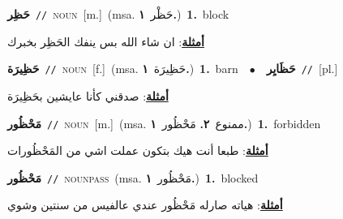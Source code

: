 \documentclass[10pt,a4paper,twoside]{article} %
\begin{document}
\begin{multicols}{2}
{\setlength\topsep{0pt}\textbf{\foreignlanguage{arabic}{حَظِر}}\ {\color{gray}\texttt{//}\color{black}}\ \textsc{noun}\ [m.]\ \color{gray}(msa. \foreignlanguage{arabic}{حَظْر}~\foreignlanguage{arabic}{\textbf{١.}})\color{black}\ \textbf{1.}~block\  \begin{flushright}\color{gray}\foreignlanguage{arabic}{\textbf{\underline{\foreignlanguage{arabic}{أمثلة}}}: ان شاء الله بس ينفك الحَظِر بخبرك}\end{flushright}\color{black}} \vspace{2mm}

{\setlength\topsep{0pt}\textbf{\foreignlanguage{arabic}{حَظِيرَة}}\ {\color{gray}\texttt{//}\color{black}}\ \textsc{noun}\ [f.]\ \color{gray}(msa. \foreignlanguage{arabic}{حَظِيرَة}~\foreignlanguage{arabic}{\textbf{١.}})\color{black}\ \textbf{1.}~barn\ \ $\bullet$\ \ \setlength\topsep{0pt}\textbf{\foreignlanguage{arabic}{حَظَايِر}}\ {\color{gray}\texttt{//}\color{black}}\ [pl.]\  \begin{flushright}\color{gray}\foreignlanguage{arabic}{\textbf{\underline{\foreignlanguage{arabic}{أمثلة}}}: صدقني كأنا عايشين بحَظِيرَة}\end{flushright}\color{black}} \vspace{2mm}

{\setlength\topsep{0pt}\textbf{\foreignlanguage{arabic}{مَحْظُور}}\ {\color{gray}\texttt{//}\color{black}}\ \textsc{noun}\ [m.]\ \color{gray}(msa. \foreignlanguage{arabic}{ممنوع}~\foreignlanguage{arabic}{\textbf{٢.}}  \foreignlanguage{arabic}{مَحْظُور}~\foreignlanguage{arabic}{\textbf{١.}})\color{black}\ \textbf{1.}~forbidden\  \begin{flushright}\color{gray}\foreignlanguage{arabic}{\textbf{\underline{\foreignlanguage{arabic}{أمثلة}}}: طبعا أنت هيك بتكون عملت اشي من المَحْظُورات}\end{flushright}\color{black}} \vspace{2mm}

{\setlength\topsep{0pt}\textbf{\foreignlanguage{arabic}{مَحْظُور}}\ {\color{gray}\texttt{//}\color{black}}\ \textsc{noun\textunderscore pass}\ \color{gray}(msa. \foreignlanguage{arabic}{مَحْظُور}~\foreignlanguage{arabic}{\textbf{١.}})\color{black}\ \textbf{1.}~blocked\  \begin{flushright}\color{gray}\foreignlanguage{arabic}{\textbf{\underline{\foreignlanguage{arabic}{أمثلة}}}: هياته صارله مَحْظُور عندي عالفيس من سنتين وشوي}\end{flushright}\color{black}} \vspace{2mm}


\end{multicols}
\end{document}
